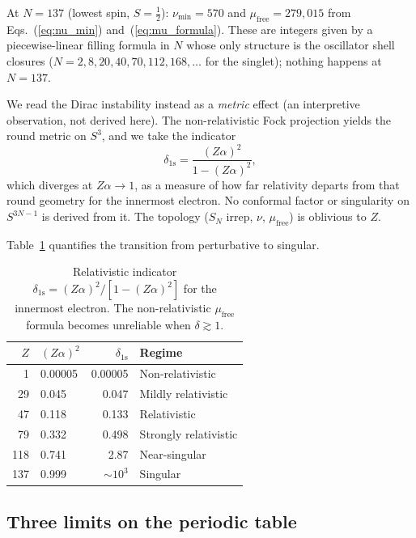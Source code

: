 \documentclass[aps,prl,twocolumn,superscriptaddress,longbibliography]{revtex4-2}
\newcommand{\mufree}{\mu_{\mathrm{free}}}
\begin{document}
At $N = 137$ (lowest spin, $S = \tfrac12$): $\nu_{\min} = 570$ and
$\mufree = 279{,}015$ from Eqs.~(\ref{eq:nu_min})
and~(\ref{eq:mu_formula}).  These are integers given by a
piecewise-linear filling formula in $N$ whose only structure is the
oscillator shell closures ($N = 2, 8, 20, 40, 70, 112, 168, \ldots$ for
the singlet); nothing happens at $N = 137$.

We read the Dirac instability instead as a \emph{metric} effect
(an interpretive observation, not derived here).  The
non-relativistic Fock projection yields the round metric on $S^3$, and
we take the indicator
\begin{equation}
  \delta_{\mathrm{1s}} = \frac{(Z\alpha)^2}{1 - (Z\alpha)^2},
  \label{eq:metric_correction}
\end{equation}
which diverges at $Z\alpha \to 1$, as a measure of how far relativity
departs from that round geometry for the innermost electron.  No
conformal factor or singularity on $S^{3N-1}$ is derived from it.  The
topology ($S_N$ irrep, $\nu$, $\mufree$) is oblivious to $Z$.

Table~\ref{tab:metric} quantifies the transition from perturbative
to singular.

\begin{table}[h]
\centering
\caption{Relativistic indicator $\delta_{1\mathrm{s}} =
(Z\alpha)^2/[1 - (Z\alpha)^2]$ for the innermost electron.  The
non-relativistic $\mufree$ formula becomes unreliable when
$\delta \gtrsim 1$.}
\label{tab:metric}
\begin{tabular}{rlrl}
\toprule
$Z$ & $(Z\alpha)^2$ & $\delta_{1\mathrm{s}}$ & Regime \\
\midrule
  1 & 0.00005 & 0.00005 & Non-relativistic \\
 29 & 0.045   & 0.047   & Mildly relativistic \\
 47 & 0.118   & 0.133   & Relativistic \\
 79 & 0.332   & 0.498   & Strongly relativistic \\
118 & 0.741   & 2.87    & Near-singular \\
137 & 0.999   & $\sim 10^3$ & Singular \\
\bottomrule
\end{tabular}
\end{table}

\subsection{Three limits on the periodic table}
\end{document}
